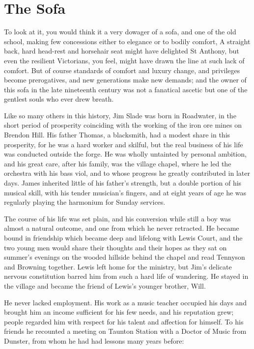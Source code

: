 \section{The Sofa}

To look at it, you would think it a very dowager of a sofa, and one of the old school, making few concessions either to elegance or to bodily comfort, A straight back, hard head-rest and horsehair seat might have delighted St Anthony, but even the resilient Victorians, you feel, might have drawn the line at such lack of comfort. But of course standards of comfort and luxury change, and privileges become prerogatives, and new generations make new demands; and the owner of this sofa in the late nineteenth century was not a fanatical ascetic but one of the gentlest souls who ever drew breath.

Like so many others in this history, Jim Slade was born in Roadwater, in the short period of prosperity coinciding with the working of the iron ore mines on Brendon Hill. His father Thomas, a blacksmith, had a modest share in this prosperity, for he was a hard worker and skilful, but the real business of his life was conducted outside the forge. He was wholly untainted by personal ambition, and his great care, after his family, was the village chapel, where he led the orchestra with his bass viol, and to whose progress he greatly contributed in later days. James inherited little of his father's strength, but a double portion of his musical skill, with his tender musician's fingers, and at eight years of age he was regularly playing the harmonium for Sunday services.

The course of his life was set plain, and his conversion while still a boy was almost a natural outcome, and one from which he never retracted. He became bound in friendship which became deep and lifelong with Lewis Court, and the two young men would share their thoughts and their hopes as they sat on summer's evenings on the wooded hillside behind the chapel and read Tennyson and Browning together. Lewis left home for the ministry, but Jim's delicate nervous constitution barred him from such a hard life of wandering. He stayed in the village and became the friend of Lewis's younger brother, Will.

He never lacked employment. His work as a music teacher occupied his days and brought him an income sufficient for his few needs, and his reputation grew; people regarded him with respect for his talent and affection for himself. To his friends he recounted a meeting on Taunton Station with a Doctor of Music from Dunster, from whom he had had lessons many years before: \\


